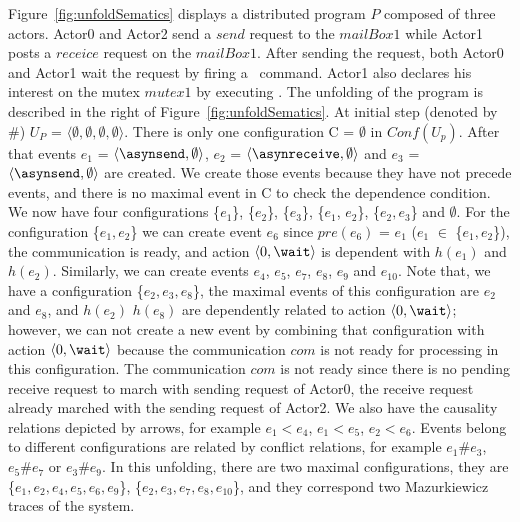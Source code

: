 \documentclass[a4paper,11pt]{article}
\theoremstyle{break}
\begin{document}
Figure~\ref{fig:unfoldSematics} displays a distributed program $P$ composed of three actors. Actor0 and Actor2 send a $send$ request to the $mailBox1$ while Actor1 posts a $receice$ request on the $mailBox1$. After sending the request, both Actor0 and Actor1 wait the request by firing a \wait~command. Actor1 also declares his interest on the mutex $mutex1$ by executing \mutexlock. The unfolding of the program is described in the right of Figure~\ref{fig:unfoldSematics}. At initial step (denoted by \#) $U_P$ = $\langle \emptyset, \emptyset, \emptyset,\emptyset \rangle$. There is only one configuration C = $\emptyset$ in $Conf(U_p)$. After that events $e_1$ = $\langle \asynsend, \emptyset \rangle$, $e_2$ = $\langle \asynreceive, \emptyset \rangle$ and $e_3$ = $\langle \asynsend, \emptyset \rangle$ are created. We create those events because they have not  precede events, and there is no maximal event in  C to check the dependence condition. We now have four configurations \{$e_1$\}, \{$e_2$\}, \{$e_3$\}, \{$e_1$, $e_2$\}, \{$e_2, e_3$\} and $\emptyset$. For the configuration \{$e_1, e_2$\} we can create event $e_6$ since $pre(e_6)$ = $e_1$ ($e_1$ $\in$ \{$e_1, e_2$\}), the communication is ready, and action $\langle 0, \wait \rangle$ is dependent with $h(e_1)$ and $h(e_2)$. Similarly, we can create events $e_4$, $e_5$, $e_7$, $e_8$, $e_9$ and $e_{10}$. Note that, we have a configuration \{$e_2, e_3, e_8$\}, the maximal events of this configuration are $e_2$ and $e_8$, and $h(e_2)$ $h(e_8)$ are dependently related to action $\langle 0, \wait \rangle$; however, we can not create a new event by combining that configuration with action $\langle 0, \wait \rangle$ because the communication $com$ is not ready for processing in this configuration. The communication $com$ is not ready since there is no pending receive request to march with sending request of Actor0, the receive request already marched with the sending request of Actor2.  We also have the causality relations depicted by arrows, for example $e_1<e_4$, $e_1<e_5$, $e_2<e_6$. Events belong to different configurations are related by conflict relations, for example $e_1 \# e_3$, $e_5 \# e_7$ or $e_3 \# e_9$. In this unfolding, there are two maximal configurations, they are \{$e_1, e_2, e_4, e_5, e_6, e_9 $\}, \{$e_2, e_3, e_7, e_8, e_{10}$\}, and they correspond two Mazurkiewicz traces of the system. 
\end{document}
